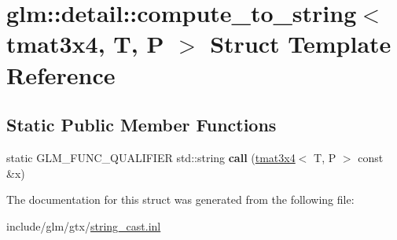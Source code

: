 \hypertarget{structglm_1_1detail_1_1compute__to__string_3_01tmat3x4_00_01T_00_01P_01_4}{}\section{glm\+:\+:detail\+:\+:compute\+\_\+to\+\_\+string$<$ tmat3x4, T, P $>$ Struct Template Reference}
\label{structglm_1_1detail_1_1compute__to__string_3_01tmat3x4_00_01T_00_01P_01_4}
\subsection*{Static Public Member Functions}
\begin{DoxyCompactItemize}
\item 
\mbox{\label{structglm_1_1detail_1_1compute__to__string_3_01tmat3x4_00_01T_00_01P_01_4_ad496094b177c77e467902ffb5bc3b0db}} 
static G\+L\+M\+\_\+\+F\+U\+N\+C\+\_\+\+Q\+U\+A\+L\+I\+F\+I\+ER std\+::string {\bfseries call} (\hyperlink{structglm_1_1tmat3x4}{tmat3x4}$<$ T, P $>$ const \&x)
\end{DoxyCompactItemize}


The documentation for this struct was generated from the following file\+:\begin{DoxyCompactItemize}
\item 
include/glm/gtx/\hyperlink{string__cast_8inl}{string\+\_\+cast.\+inl}\end{DoxyCompactItemize}
